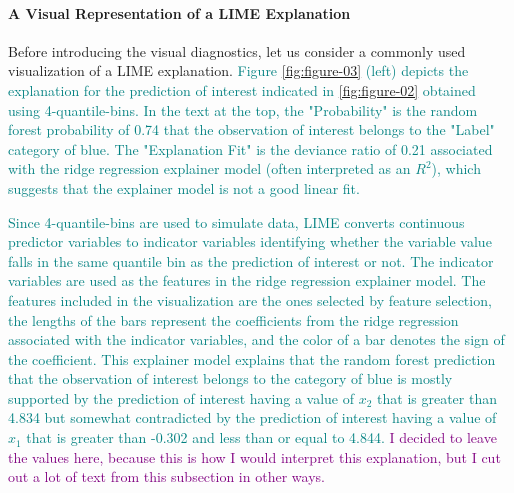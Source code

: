 \documentclass[AMS,STIX2COL]{WileyNJD-v2}\usepackage[]{graphicx}\usepackage[]{color}
\newcommand{\kgc}[1]{\textcolor{purple}{#1}}
\newcommand{\kge}[1]{\textcolor{teal}{#1}}
\renewcommand{\sout}[1]{\unskip}
\begin{document}
\paragraph{A Visual Representation of a LIME Explanation}

Before introducing the visual diagnostics, let us consider a commonly used visualization of a LIME explanation\sout{ that is shown in Figure \ref{fig:figure-03} (left)}. \kge{Figure \ref{fig:figure-03} (left) depicts the explanation for the prediction of interest indicated in \autoref{fig:figure-02} obtained using 4-quantile-bins. In the text at the top, the "Probability" is the random forest probability of 0.74 that the observation of interest belongs to the "Label" category of blue. The "Explanation Fit" is the deviance ratio of 0.21 associated with the ridge regression explainer model (often interpreted as an $R^2$), which suggests that the explainer model is not a good linear fit.}

\kge{Since 4-quantile-bins are used to simulate data, LIME converts continuous predictor variables to indicator variables identifying whether the variable value falls in the same quantile bin as the prediction of interest or not. The indicator variables are used as the features in the ridge regression explainer model. The features included in the visualization are the ones selected by feature selection, the lengths of the bars represent the coefficients from the ridge regression associated with the indicator variables, and the color of a bar denotes the sign of the coefficient. This explainer model explains that the random forest prediction that the observation of interest belongs to the category of blue is mostly supported by the prediction of interest having a value of $x_2$ that is greater than 4.834 but somewhat contradicted by the prediction of interest having a value of $x_1$ that is greater than -0.302 and less than or equal to 4.844.} \kgc{I decided to leave the values here, because this is how I would interpret this explanation, but I cut out a lot of text from this subsection in other ways.}

\sout{Before introducing the visual diagnostics, let us consider a commonly used visualization of a LIME explanation\sout{ that is shown in Figure \ref{fig:figure-03} (left)}. \kge{Figure \ref{fig:figure-03} (left) shows the explanation for the prediction of interest indicated in \autoref{fig:figure-02} obtained using 4-quantile-bins.} \sout{The plot is created using the \emph{lime} R package and provides a visual representation of a LIME explanation for the prediction of interest indicated in \autoref{fig:figure-02}. In particular, the explanation is obtained using 4-quantile-bins to simulate the data.} \kge{When quantile bins are used to simulate data}\sout{ In this scenario}, LIME converts continuous predictor variables to indicator variables identifying whether the variable value falls in the same quantile bin as the prediction of interest or not. The\kge{n the} indicator variables are used as the explainer model features.}
\end{document}

